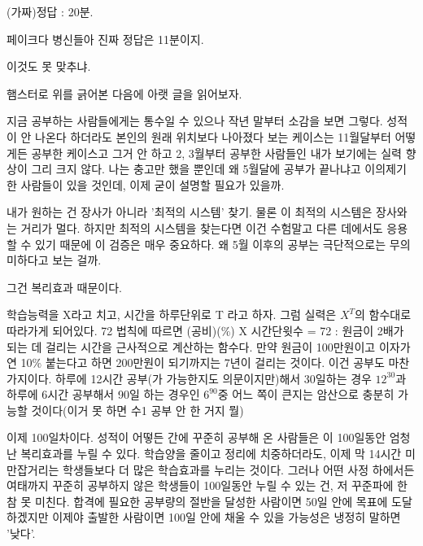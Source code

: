 (가짜)정답 : 20분.
\vspace{5mm}

\newpage

페이크다 병신들아 진짜 정답은 11분이지.
\vspace{5mm}

이것도 못 맞추냐.
\vspace{5mm}

햄스터로 위를 긁어본 다음에 아랫 글을 읽어보자.
\vspace{5mm}

지금 공부하는 사람들에게는 통수일 수 있으나 작년 말부터 소감을 보면 그렇다.
성적이 안 나온다 하더라도 본인의 원래 위치보다 나아졌다 보는 케이스는 11월달부터 어떻게든 공부한 케이스고
그거 안 하고 2, 3월부터 공부한 사람들인 내가 보기에는 실력 향상이 그리 크지 않다.
나는 충고만 했을 뿐인데 왜 5월달에 공부가 끝나냐고 이의제기한 사람들이 있을 것인데, 이제 굳이 설명할 필요가 있을까.
\vspace{5mm}

내가 원하는 건 장사가 아니라 '최적의 시스템' 찾기. 물론 이 최적의 시스템은 장사와는 거리가 멀다.
하지만 최적의 시스템을 찾는다면 이건 수험말고 다른 데에서도 응용할 수 있기 때문에 이 검증은 매우 중요하다.
왜 5월 이후의 공부는 극단적으로는 무의미하다고 보는 걸까.
\vspace{5mm}

그건 복리효과 때문이다.
\vspace{5mm}

학습능력을 X라고 치고, 시간을 하루단위로 T 라고 하자. 그럼 실력은 $X^T$의 함수대로 따라가게 되어있다.
72 법칙에 따르면 (공비)($\%$) X 시간단윗수 = 72 : 원금이 2배가 되는 데 걸리는 시간을 근사적으로 계산하는 함수다.
만약 원금이 100만원이고 이자가 연 10$\%$ 붙는다고 하면 200만원이 되기까지는 7년이 걸리는 것이다.
이건 공부도 마찬가지이다.
하루에 12시간 공부(가 가능한지도 의문이지만)해서 30일하는 경우 $12^30$과
하루에 6시간 공부해서 90일 하는 경우인 $6^90 $중 어느 쪽이 큰지는 암산으로 충분히 가능할 것이다(이거 못 하면 수1 공부 안 한 거지 뭘)
\vspace{5mm}

이제 100일차이다.
성적이 어떻든 간에 꾸준히 공부해 온 사람들은 이 100일동안 엄청난 복리효과를 누릴 수 있다.
학습양을 줄이고 정리에 치중하더라도, 이제 막 14시간 미만잡거리는 학생들보다 더 많은 학습효과를 누리는 것이다.
그러나 어떤 사정 하에서든 여태까지 꾸준히 공부하지 않은 학생들이 100일동안 누릴 수 있는 건, 저 꾸준파에 한참 못 미친다.
합격에 필요한 공부량의 절반을 달성한 사람이면 50일 안에 목표에 도달하겠지만
이제야 출발한 사람이면 100일 안에 채울 수 있을 가능성은 냉정히 말하면 '낮다'.
\vspace{5mm}

